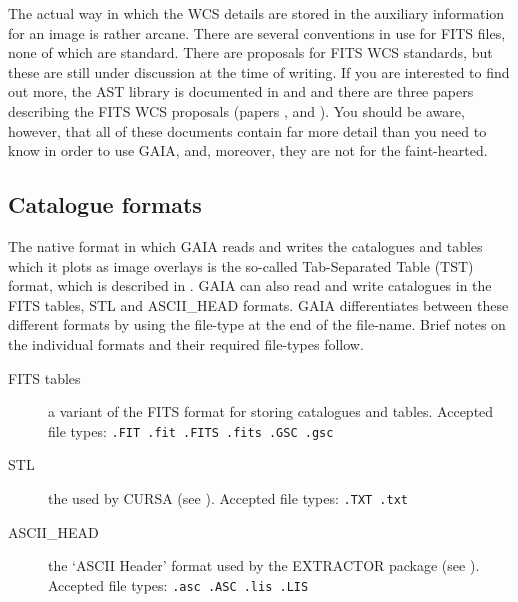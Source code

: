\documentclass[twoside,11pt]{starlink}
\begin{document}
The actual way in which the WCS details are stored in the auxiliary
information for an image is rather arcane.  There are several
conventions in use for FITS files, none of which are standard.  There
are proposals for FITS WCS standards, but these are still under
discussion at the time of writing.  If you are interested to find out
more, the AST library is documented in \cite{SUN210}
and \cite{SUN211} and there are three papers
describing the FITS WCS proposals (papers
,
and
).
You should be aware, however, that all of these documents contain far more
detail than you need to know in order to use GAIA, and, moreover, they
are not for the faint-hearted.

\subsection{\label{CATS}Catalogue formats}

The native format in which GAIA reads and writes the catalogues and tables
which it plots as image overlays is the so-called Tab-Separated Table (TST)
format, which is described in \cite{SSN75}.  GAIA
can also read and write catalogues in the FITS tables, STL and ASCII\_HEAD
formats.  GAIA differentiates between these different formats by using the
file-type at the end of the file-name.  Brief notes on the individual
formats and their required file-types follow.

\begin{description}

  \item[FITS tables] a variant of the FITS format for storing catalogues
   and tables.  Accepted file types: \texttt{.FIT .fit .FITS .fits .GSC .gsc}

  \item[STL] the  used by
   CURSA (see \cite{SUN190}).  Accepted file
   types: \texttt{.TXT .txt}

  \item[ASCII\_HEAD] the `ASCII Header' format used by the EXTRACTOR
   package (see \cite{SUN226}).  Accepted file
   types: \texttt{.asc .ASC .lis .LIS}

\end{description}
\end{document}
